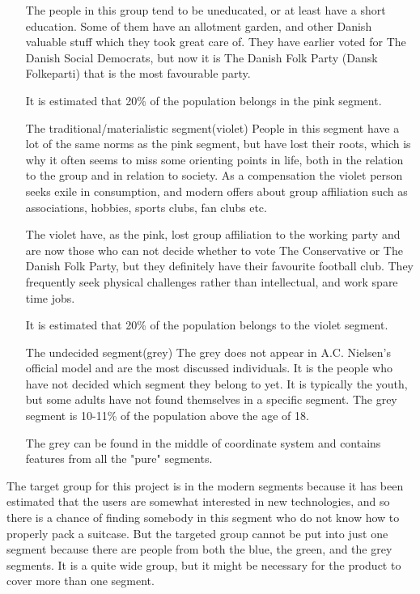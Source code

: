 \begin{itemize}
The people in this group tend to be uneducated, or at least have a short education. Some of them have an allotment garden, and other Danish valuable stuff which they took great care of. They have earlier voted for The Danish Social Democrats, but now it is The Danish Folk Party (Dansk Folkeparti) that is the most favourable party.

It is estimated that 20\% of the population belongs in the pink segment.

\item[The traditional/materialistic segment(violet)]
People in this segment have a lot of the same norms as the pink segment, but have lost their roots, which is why it often seems to miss some orienting points in life, both in the relation to the group and in relation to society. As a compensation the violet person seeks exile in consumption, and modern offers about group affiliation such as associations, hobbies, sports clubs, fan clubs etc. 

The violet have, as the pink, lost group affiliation to the working party and are now those who can not decide whether to vote The Conservative or The Danish Folk Party, but they definitely have their favourite football club. They frequently seek physical challenges rather than intellectual, and work spare time jobs.

It is estimated that 20\% of the population belongs to the violet segment.

\item[The undecided segment(grey)]
The grey does not appear in A.C. Nielsen's official model and are the most discussed individuals. It is the people who have not decided which segment they belong to yet. It is typically the youth, but some adults have not found themselves in a specific segment. The grey segment is 10-11\% of the population above the age of 18.

The grey can be found in the middle of coordinate system and contains features from all the "pure" segments.
\end{itemize}
\citep{minerva}

The target group for this project is in the modern segments because it has been estimated that the users are somewhat interested in new technologies, and so there is a chance of finding somebody in this segment who do not know how to properly pack a suitcase. But the targeted group cannot be put into just one segment because there are people from both the blue, the green, and the grey segments. It is a quite wide group, but it might be necessary for the product to cover more than one segment.